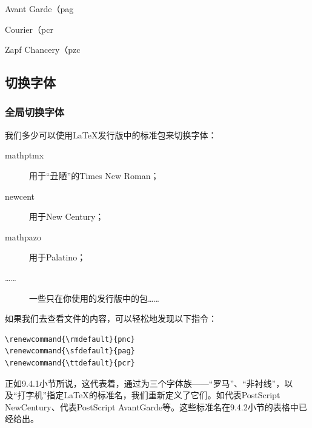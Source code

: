   \begin{decritfonte}{Avant Garde（}{pag}
  \end{decritfonte}
  
  \begin{decritfonte}{Courier（}{pcr}
  \end{decritfonte}
  
  \begin{decritfonte}{Zapf Chancery（}{pzc}
  \end{decritfonte}

  \subsection{切换字体}

  \subsubsection{全局切换字体}

  我们多少可以使用\LaTeX 发行版中的标准包来切换字体：

  \begin{description}
    \item[\textsf{mathptmx}] 用于“丑陋”的Times New Roman；
    \item[\textsf{newcent}] 用于New Century；
    \item[\textsf{mathpazo}] 用于Palatino；
    \item[……] 一些只在你使用的发行版中的包……
  \end{description}

  如果我们去查看文件的内容，可以轻松地发现以下指令：

  \begin{dmd}
  \begin{verbatim}
\renewcommand{\rmdefault}{pnc}
\renewcommand{\sfdefault}{pag}
\renewcommand{\ttdefault}{pcr}
  \end{verbatim}
  \end{dmd}

正如9.4.1小节所说，这代表着，通过为三个字体族——“罗马”、“非衬线”，以及“打字机”指定\LaTeX 的标准名，我们重新定义了它们。如代表PostScript NewCentury、代表PostScript AvantGarde等。这些标准名在9.4.2小节的表格中已经给出。

